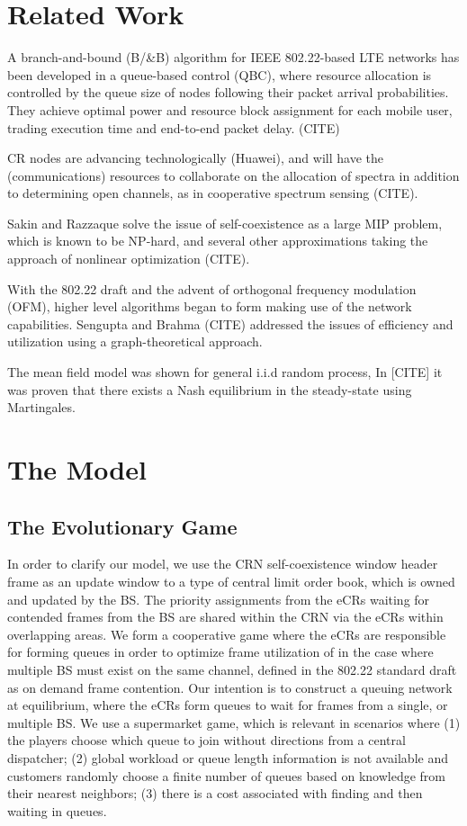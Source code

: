 \documentclass[10pt]{article}
\theoremstyle{definition}
\begin{document}
\section{Related Work}

A branch-and-bound (B/\&B) algorithm for IEEE 802.22-based LTE networks has been
developed in a queue-based control (QBC), where resource allocation is
controlled by the queue size of nodes following their packet arrival
probabilities. They achieve optimal power and resource block assignment for each
mobile user, trading execution time and end-to-end packet delay. (CITE) 

CR nodes are advancing technologically (Huawei), and will have the
(communications) resources to collaborate on the allocation of spectra in
addition to determining open channels, as in cooperative spectrum sensing
(CITE). 

Sakin and Razzaque solve the issue of self-coexistence as a large MIP problem,
which is known to be NP-hard, and several other approximations taking the
approach of nonlinear optimization (CITE).

With the 802.22 draft and the advent of orthogonal frequency modulation (OFM),
higher level algorithms began to form making use of the network capabilities.
Sengupta and Brahma (CITE) addressed the issues of efficiency and utilization
using a graph-theoretical approach. 

The mean field model was shown for general i.i.d random process, 
In [CITE] it was proven that there exists a Nash equilibrium in the
steady-state using Martingales.

\section{The Model}

\subsection{The Evolutionary Game}

In order to clarify our model, we use the CRN 
self-coexistence window header frame as an update window to
a type of central limit order book, which is owned and updated by the BS. 
The priority assignments from the eCRs waiting for contended frames 
from the BS are shared within the CRN via the eCRs within overlapping
areas. We form a cooperative game where the eCRs are responsible for forming queues in order
to optimize frame utilization of in the case where multiple BS must exist on the
same channel, defined in the 802.22 standard draft as on demand frame
contention. Our intention is to construct a queuing network at equilibrium, where the eCRs form
queues to wait for frames from a single, or multiple BS. 
We use a supermarket game, which is relevant in scenarios where (1) the players choose which
queue to join without directions from a central dispatcher; (2) global workload or
queue length information is not available and customers randomly choose a finite
number of queues based on knowledge from their nearest neighbors; (3) there is a cost
associated with finding and then waiting in queues.
\end{document}
